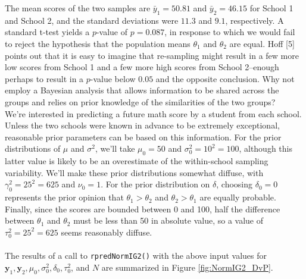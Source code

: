 \documentclass[12pt, a4paper]{article}
\begin{document}
\noindent The mean scores of the two samples are $\bar{y}_1 = 50.81$ and $\bar{y}_2 = 46.15$ for School 1 and School 2, and the standard deviations were $11.3$ and $9.1$, respectively.  A standard t-test yields a $p$-value of $p = 0.087$, in response to which we would fail to reject the hypothesis that the population means $\theta_1$ and $\theta_2$ are equal. Hoff [5] points out that it is easy to imagine that re-sampling might result in a few more low scores from School 1 and a few more high scores from School 2--enough perhaps to result in a $p$-value below $0.05$ and the opposite conclusion. Why not employ a Bayesian analysis that allows information to be shared across the groups and relies on prior knowledge of the similarities of the two groups?\\

\noindent We're interested in predicting a future math score by a student from each school.  Unless the two schools were known in advance to be extremely exceptional, reasonable prior parameters can be based on this information.  For the prior distributions of $\mu$ and $\sigma^2$, we'll take $\mu_0 = 50$ and $\sigma^2_0 = 10^2 = 100$, although this latter value is likely to be an overestimate of the within-school sampling variability.  We'll make these prior distributions somewhat diffuse, with $\gamma^2_0 = 25^2 = 625$ and $\nu_0 = 1$.  For the prior distribution on $\delta$, choosing $\delta_0 = 0$ represents the prior opinion that $\theta_1 > \theta_2$ and $\theta_2 > \theta_1$ are equally probable.  Finally, since the scores are bounded between 0 and 100, half the difference between $\theta_1$ and $\theta_2$ must be less than 50 in absolute value, so a value of $\tau^2_0 = 25^2 = 625$ seems reasonably diffuse.\\\\

\noindent The results of a call to \texttt{rpredNormIG2()} with the above input values for $\mathbf{y}_1,\mathbf{y}_2,\mu_0,\sigma^2_0,\delta_0,\tau^2_0$, and $N$ are summarized in Figure \ref{fig:NormIG2_DvP}.\\
\end{document}
